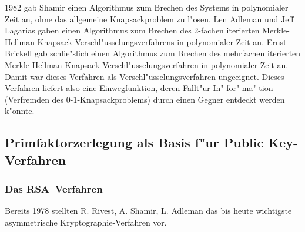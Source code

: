 1982 gab  Shamir \cite{Shamir1982} einen Algorithmus zum Brechen des Systems in polynomialer Zeit an, ohne das allgemeine Knapsackproblem zu l"osen. Len  Adleman \cite{Adleman1982} und Jeff Lagarias  \cite{Lagarias1983} gaben einen Algorithmus zum Brechen des 2-fachen iterierten Merkle-Hellman-Knapsack Verschl"usselungsverfahrens in polynomialer Zeit an. Ernst Brickell  \cite{Brickell1985} gab schlie"slich einen Algorithmus zum Brechen des mehrfachen iterierten Merkle-Hellman-Knapsack Verschl"usselungsverfahren in polynomialer Zeit an. Damit war dieses Verfahren als Verschl"usselungsverfahren ungeeignet. Dieses Verfahren liefert also eine Einwegfunktion, deren Fallt"ur-In"-for"-ma"-tion (Verfremden des 0-1-Knapsackproblems) durch einen Gegner entdeckt werden k"onnte.


\subsection{Primfaktorzerlegung als Basis f"ur Public Key-Verfahren}


\subsubsection{Das RSA--Verfahren}
 \hypertarget{RSAVerfahren}{} Bereits 1978 stellten R.  Rivest,  A. Shamir,   L. Adleman \cite{RSA1978} das bis heute wichtigste 
asymmetrische Kryptographie-Verfahren vor.  \par

\begin{center}
\end{center}

